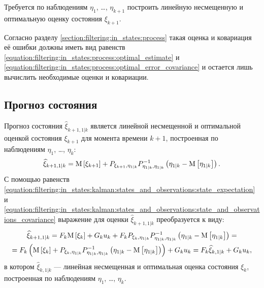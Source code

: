 Требуется по наблюдениям $\eta_1$, \dots, $\eta_{k+1}$ построить линейную несмещенную и оптимальную оценку состояния $\xi_{k+1}$.

Согласно разделу \ref{section:filtering:in_states:process} такая оценка и ковариация её ошибки должны иметь вид равенств
\eqref{equation:filtering:in_states:process:optimal_estimate} и \eqref{equation:filtering:in_states:process:optimal_error_covariance} и остается лишь вычислить
необходимые оценки и ковариации.

\subsection{Прогноз состояния}

Прогноз состояния $\widehat{\xi}_{k+1,1|k}$ является линейной несмещенной и оптимальной оценкой состояния $\xi_{k+1}$ для момента времени $k+1$, построенная по
наблюдениям $\eta_1$, \dots, $\eta_k$:
\begin{equation} \label{equation:filtering:in_states:kalman:state_prediction}
	\widehat{\xi}_{k+1, 1|k} = \mathrm{M} \left [ \xi_{k+1} \right ] + P_{\xi_{k+1}, \eta_{1|k}} P_{\eta_{1|k}, \eta_{1|k}}^{-1} \left ( \eta_{1|k} - \mathrm{M} \left [ \eta_{1|k} \right ] \right ) .
\end{equation}
С помощью равенств \eqref{equation:filtering:in_states:kalman:states_and_observations:state_expectation} и
\eqref{equation:filtering:in_states:kalman:states_and_observations:state_and_observations_covariance} выражение для оценки $\widehat{\xi}_{k+1, 1|k}$ преобразуется к виду:
\begin{multline} \label{equation:filtering:in_states:kalman:state_prediction:recursion}
	\widehat{\xi}_{k+1, 1|k}
		= F_k \mathrm{M} \left [ \xi_k \right ] + G_k u_k + F_k P_{\xi_k, \eta_{1|k}} P_{\eta_{1|k},\eta_{1|k}}^{-1} \left ( \eta_{1|k} - \mathrm{M} \left [ \eta_{1|k} \right ] \right ) = \\
	= F_k \left ( \mathrm{M} \left [ \xi_k \right ] + P_{\xi_k, \eta_{1|k}} P_{\eta_{1|k},\eta_{1|k}}^{-1} \left ( \eta_{1|k} - \mathrm{M} \left [ \eta_{1|k} \right ] \right ) \right ) + G_k u_k
		= F_k \widehat{\xi}_{k,1|k} + G_k u_k
	,
\end{multline}
в котором $\widehat{\xi}_{k,1|k}$ --- линейная несмещенная и оптимальная оценка состояния $\xi_k$, построенная по наблюдениям $\eta_1$, \dots, $\eta_k$.

